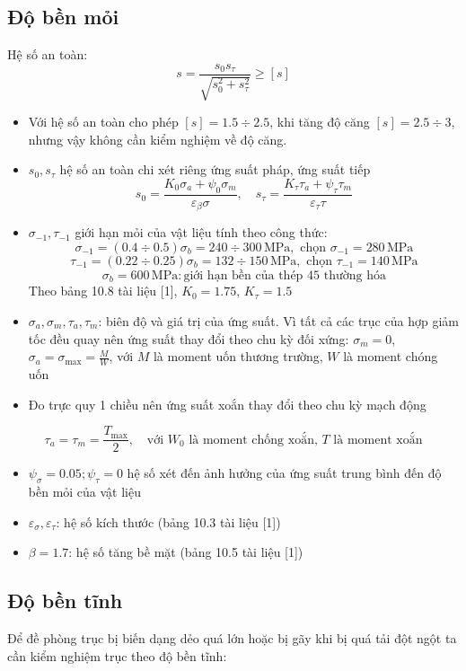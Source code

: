 \subsection{Độ bền mỏi}
Hệ số an toàn:
\[
s = \frac{s_0 s_\tau}{\sqrt{s_0^2 + s_\tau^2}} \geq [s]
\]
\begin{itemize}
    \item Với hệ số an toàn cho phép $[s] = 1.5 \div 2.5$, khi tăng độ căng $[s] = 2.5 \div 3$, nhưng vậy không cần kiểm nghiệm về độ căng.
    \item $s_0, s_\tau$ hệ số an toàn chi xét riêng ứng suất pháp, ứng suất tiếp
    \[
    s_0 = \frac{K_0 \sigma_a + \psi_0 \sigma_m}{\varepsilon_\beta \sigma}, \quad s_\tau = \frac{K_\tau \tau_a + \psi_\tau \tau_m}{\varepsilon_\tau \tau}
    \]
    \item $\sigma_{-1}, \tau_{-1}$ giới hạn mỏi của vật liệu tính theo công thức:
    \[
    \sigma_{-1} = (0.4 \div 0.5) \sigma_b = 240 \div 300 \, \text{MPa}, \text{ chọn } \sigma_{-1} = 280 \, \text{MPa}
    \]
    \[
    \tau_{-1} = (0.22 \div 0.25) \sigma_b = 132 \div 150 \, \text{MPa}, \text{ chọn } \tau_{-1} = 140 \, \text{MPa}
    \]
    \[
    \sigma_b = 600 \, \text{MPa}: \text{giới hạn bền của thép 45 thường hóa}
    \]
    Theo bảng 10.8 tài liệu [1], $K_0 = 1.75$, $K_\tau = 1.5$
    \item $\sigma_a, \sigma_m, \tau_a, \tau_m$: biên độ và giá trị của ứng suất. Vì tất cả các trục của hợp giảm tốc đều quay nên ứng suất thay đổi theo chu kỳ đối xứng: $\sigma_m = 0$, $\sigma_a = \sigma_{\text{max}} = \frac{M}{W}$, với $M$ là moment uốn thương trường, $W$ là moment chóng uốn
    \item Đo trực quy 1 chiều nên ứng suất xoắn thay đổi theo chu kỳ mạch động
\end{itemize}
\[
\tau_a = \tau_m = \frac{T_{\text{max}}}{2}, \quad \text{với } W_0 \text{ là moment chống xoắn, } T \text{ là moment xoắn}
\]
\begin{itemize}
    \item $\psi_\sigma = 0.05; \psi_\tau = 0$ hệ số xét đến ảnh hưởng của ứng suất trung bình đến độ bền mỏi của vật liệu
    \item $\varepsilon_\sigma, \varepsilon_\tau$: hệ số kích thước (bảng 10.3 tài liệu [1])
    \item $\beta = 1.7$: hệ số tăng bề mặt (bảng 10.5 tài liệu [1])
\end{itemize}
\subsection{Độ bền tĩnh}
Để đề phòng trục bị biến dạng dẻo quá lớn hoặc bị gãy khi bị quá tải đột ngột ta cần kiểm nghiệm trục theo độ bền tĩnh:

